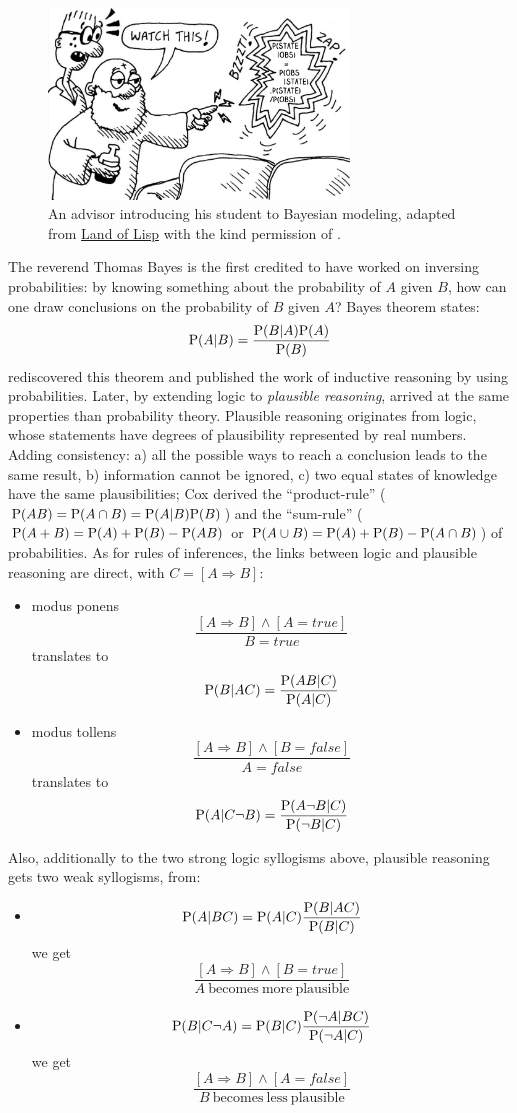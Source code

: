 \begin{figure}[!ht]
\centering
\includegraphics[width=8cm]{images/zapBayes3.png}
\caption{An advisor introducing his student to Bayesian modeling, adapted from \underline{Land of Lisp} with the kind permission of \cite{LoL}.}
\end{figure}


The reverend Thomas Bayes is the first credited to have worked on inversing probabilities: by knowing something about the probability of $A$ given $B$, how can one draw conclusions on the probability of $B$ given $A$? Bayes theorem states: $$\mathrm{P}(A|B) = \frac{\mathrm{P}(B|A)\mathrm{P}(A)}{\mathrm{P}(B)}$$
\cite{Laplace} rediscovered this theorem and published the work of inductive reasoning by using probabilities. Later, by extending logic to \textit{plausible reasoning}, \cite{Jaynes} arrived at the same properties than \cite{Kolmogorov33} probability theory. Plausible reasoning originates from logic, whose statements have degrees of plausibility represented by real numbers. %
Adding consistency: a) all the possible ways to reach a conclusion leads to the same result, b) information cannot be ignored, c) two equal states of knowledge have the same plausibilities; Cox %
derived the ``product-rule'' ($\mathrm{P}(AB)=\mathrm{P}(A\cap B)=\mathrm{P}(A|B)\mathrm{P}(B)$) and the ``sum-rule'' ($\mathrm{P}(A+B)=\mathrm{P}(A)+\mathrm{P}(B)-\mathrm{P}(AB)$ or $\mathrm{P}(A\cup B) = \mathrm{P}(A)+\mathrm{P}(B)-\mathrm{P}(A\cap B)$) of probabilities. As for rules of inferences, the links between logic and plausible reasoning are direct, with $C=[A\Rightarrow B]$:
\begin{itemize}
    \item modus ponens $$\frac{[A\Rightarrow B] \wedge [A=true]}{B=true}$$ translates to $$\mathrm{P}(B|AC)=\frac{\mathrm{P}(AB|C)}{\mathrm{P}(A|C)}$$
    \item modus tollens $$\frac{[A\Rightarrow B] \wedge [B=false]}{A=false}$$ translates to $$\mathrm{P}(A|C\neg B)=\frac{\mathrm{P}(A \neg B|C)}{\mathrm{P}(\neg B|C)}$$
\end{itemize}
Also, additionally to the two strong logic syllogisms above, plausible reasoning gets two weak syllogisms, from:
\begin{itemize}
    \item $$\mathrm{P}(A|BC)=\mathrm{P}(A|C)\frac{\mathrm{P}(B|AC)}{\mathrm{P}(B|C)}$$ we get $$\frac{[A\Rightarrow B] \wedge [B=true]}{A\ \mathrm{becomes\ more\ plausible}}$$
    \item $$\mathrm{P}(B| C\neg A)=\mathrm{P}(B|C)\frac{\mathrm{P}(\neg A|BC)}{\mathrm{P}(\neg A|C)}$$ we get $$\frac{[A\Rightarrow B] \wedge [A=false]}{B\ \mathrm{becomes\ less\ plausible}}$$
\end{itemize}

